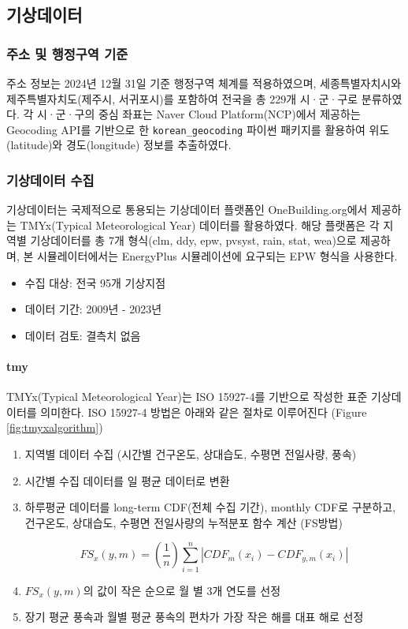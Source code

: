 \subsection{기상데이터}
\subsubsection{주소 및 행정구역 기준}
주소 정보는 2024년 12월 31일 기준 행정구역 체계를 적용하였으며, 세종특별자치시와 제주특별자치도(제주시, 서귀포시)를 포함하여 전국을 총 229개 시·군·구로 분류하였다.
각 시·군·구의 중심 좌표는 Naver Cloud Platform(NCP)에서 제공하는 Geocoding API를 기반으로 한 \texttt{korean\_geocoding} 파이썬 패키지를 활용하여 위도(latitude)와 경도(longitude) 정보를 추출하였다.

\subsubsection{기상데이터 수집}
기상데이터는 국제적으로 통용되는 기상데이터 플랫폼인 OneBuilding.org\cite{onebuilding2025}에서 제공하는 TMYx(Typical Meteorological Year) 데이터를 활용하였다. 해당 플랫폼은 각 지역별 기상데이터를 총 7개 형식(clm, ddy, epw, pvsyst, rain, stat, wea)으로 제공하며, 본 시뮬레이터에서는 EnergyPlus 시뮬레이션에 요구되는 EPW 형식을 사용한다.
\begin{itemize}
  \item 수집 대상: 전국 95개 기상지점
  \item 데이터 기간: 2009년 - 2023년
  \item 데이터 검토: 결측치 없음
\end{itemize}
\paragraph{tmy} TMYx(Typical Meteorological Year)는 ISO 15927-4를 기반으로 작성한 표준 기상데이터를 의미한다. ISO 15927-4 방법은 아래와 같은 절차로 이루어진다\cite{shimtmyx} (Figure \ref{fig:tmyxalgorithm})
\begin{enumerate}
  \item 지역별 데이터 수집 (시간별 건구온도, 상대습도, 수평면 전일사량, 풍속)
  \item 시간별 수집 데이터를 일 평균 데이터로 변환
  \item 하루평균 데이터를 long-term CDF(전체 수집 기간), monthly CDF로 구분하고, 건구온도, 상대습도, 수평면 전일사량의 누적분포 함수 계산 (FS방법)
  
\[ 
  FS_{x}(y,m) = \left(\frac{1}{n}\right) \sum_{i=1}^{n} |CDF_{m}(x_{i}) - CDF_{y,m}(x_{i})|
\]

  \item $FS_{x}(y,m)$의 값이 작은 순으로 월 별 3개 연도를 선정
  \item 장기 평균 풍속과 월별 평균 풍속의 편차가 가장 작은 해를 대표 해로 선정
\end{enumerate}

